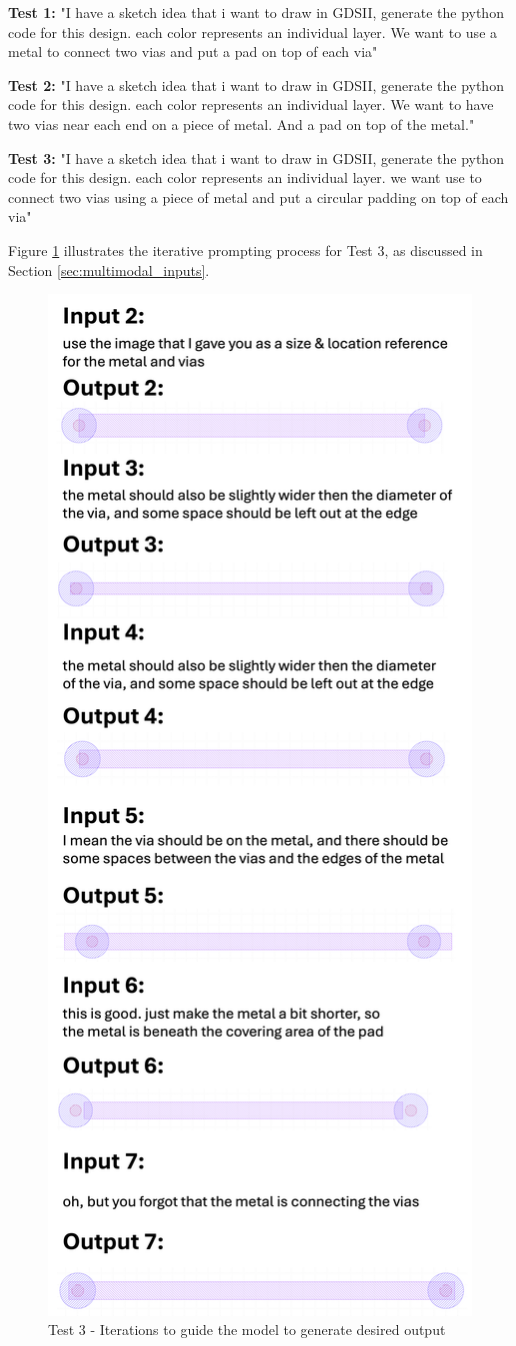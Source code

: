 \documentclass{article}
\begin{document}
\textbf{Test 1:} "I have a sketch idea that i want to draw in GDSII, generate the python code for this design. each color represents an individual layer. We want to use a metal to connect two vias and put a pad on top of each via"

\textbf{Test 2:} "I have a sketch idea that i want to draw in GDSII, generate the python code for this design. each color represents an individual layer. We want to have two vias near each end on a piece of metal. And a pad on top of the metal."

\textbf{Test 3:} "I have a sketch idea that i want to draw in GDSII, generate the python code for this design. each color represents an individual layer. we want use to connect two vias using a piece of metal and put a circular padding on top of each via"

Figure \ref{fig:test3_chat} illustrates the iterative prompting process for Test 3, as discussed in Section \ref{sec:multimodal_inputs}.

\begin{figure}[!h]
\centering
\includegraphics[width=0.5\linewidth]{Styles/Test3.png}
\caption{Test 3 - Iterations to guide the model to generate desired output}
\label{fig:test3_chat}
\end{figure}
\end{document}
